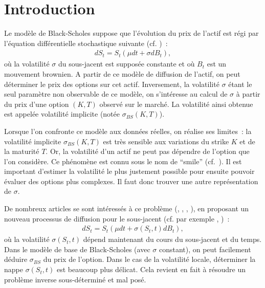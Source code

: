 \section{Introduction}

Le mod\`ele de Black-Scholes suppose que l'\'evolution du prix de 
l'actif est r\'egi par l'\'equation diff\'erentielle stochastique 
suivante (cf. \cite{bla:jpe:73})~:
\begin{eqnarray*}
dS_t = S_t (\mu dt + \sigma dB_t),
\end{eqnarray*}
o\`u la volatilit\'e $\sigma$ du sous-jacent est suppos\'ee 
constante et o\`u $B_t$ est un mouvement brownien. A partir de ce 
mod\`ele de diffusion de l'actif, on peut d\'eterminer le prix des 
options sur cet actif. Inversement, la volatilit\'e $\sigma$ \'etant 
le seul param\`etre non observable de ce mod\`ele, on s'int\'eresse 
au calcul de $\sigma$ \`a partir du prix d'une option $(K,T)$ 
observ\'e sur le march\'e. La volatilit\'e ainsi obtenue est 
appel\'ee volatilit\'e implicite (not\'ee $\sigma_{BS}(K,T)$). 

Lorsque l'on confronte ce mod\`ele aux donn\'ees r\'eelles, on 
r\'ealise ses limites~: la volatilit\'e implicite $\sigma_{BS}(K,T)$ 
est tr\`es sensible aux variations du strike $K$ et de la maturit\'e 
$T$. Or, la volatilit\'e d'un actif ne peut pas d\'ependre de 
l'option que l'on consid\`ere. Ce ph\'enom\`ene est connu sous le 
nom de ``smile'' (cf.~\cite{dup:risk:94}). Il est important d'estimer 
la volatilit\'e le plus justement possible pour ensuite pouvoir 
\'evaluer des options plus complexes. Il faut donc trouver une autre 
repr\'esentation de $\sigma$. 

De nombreux articles se sont int\'eress\'es \`a ce probl\`eme 
(\cite{lag:jcf:97}, \cite{col:jcf:99}, \cite{jac:jcf:98}, 
\cite{ave:amf:97}), en proposant un nouveau processus de diffusion 
pour le sous-jacent (cf. par exemple \cite{dup:risk:94}, 
\cite{lag:jcf:97})~: 
\begin{eqnarray*}
dS_t = S_t (\mu dt + \sigma(S_t,t) dB_t),
\end{eqnarray*}
o\`u la volatilit\'e $\sigma(S_t,t)$ d\'epend maintenant du cours 
du sous-jacent et du temps. Dans le mod\`ele de base de Black-Scholes 
(avec $\sigma$ constant), on peut facilement d\'eduire $\sigma_{BS}$ 
du prix de l'option. Dans le cas de la volatilit\'e locale, 
d\'eterminer la nappe $\sigma(S_t,t)$ est beaucoup plus d\'elicat. 
Cela revient en fait \`a r\'esoudre un probl\`eme inverse 
sous-d\'etermin\'e et mal pos\'e. 

